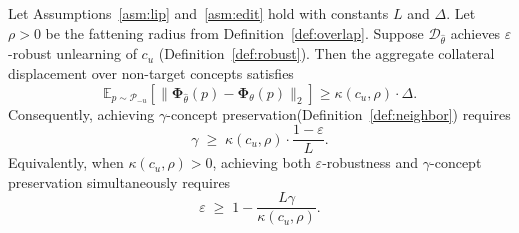 \begin{theorem}
\label{thm:tradeoff}
Let Assumptions~\ref{asm:lip} and~\ref{asm:edit} hold with constants $L$ and $\Delta$.
Let $\rho > 0$ be the fattening radius from Definition~\ref{def:overlap}.
Suppose $\mathcal{D}_{\hat\theta}$ achieves $\varepsilon$-robust unlearning of $c_u$
(Definition~\ref{def:robust}).
Then the aggregate collateral displacement over non-target concepts satisfies
\begin{equation}
    \mathbb{E}_{p\sim \mathcal{P}_{-u}}
    \left[
\|\boldsymbol{\Phi}_{\hat{\theta}}(p)-\boldsymbol{\Phi}_{\theta}(p)\|_2
    \right]
    \geq
    \kappa(c_u,\rho)\cdot \Delta .
\end{equation}
Consequently, achieving $\gamma$-concept preservation(Definition~\ref{def:neighbor}) requires
\begin{equation}
\label{eq:tradeoff}
    \boxed{
    \gamma \;\geq\; \kappa(c_u,\rho)\cdot\frac{1-\varepsilon}{L}.
    }
\end{equation}
Equivalently, when $\kappa(c_u,\rho) > 0$, achieving both $\varepsilon$-robustness and $\gamma$-concept preservation simultaneously requires
\begin{equation}
\label{eq:tradeoff_eps}
    \varepsilon \;\geq\; 1 - \frac{L\gamma}{\kappa(c_u,\rho)}.
\end{equation}
\end{theorem}

